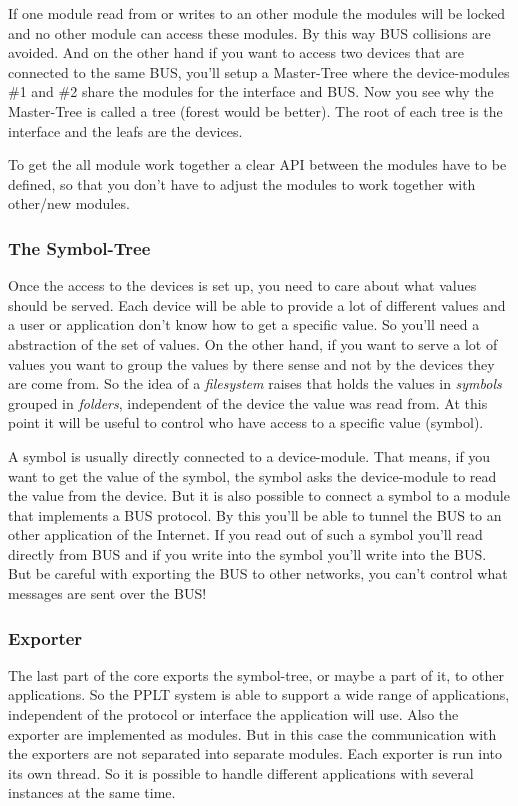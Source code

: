 If one module read from or writes to an other module the modules
will be locked and no other module can access these modules. By this way 
BUS collisions are avoided. And on the other hand if you want to access
two devices that are connected to the same BUS, you'll setup a 
Master-Tree where the device-modules \#1 and \#2 share the modules for the 
interface and BUS. Now you see why the Master-Tree is called a tree (forest 
would be better). The root of each tree is the interface and the leafs are 
the devices.

To get the all module work together a clear API between the modules have
to be defined, so that you don't have to adjust the modules to work together
with other/new modules. 

\subsubsection{The Symbol-Tree}
Once the access to the devices is set up, you need to care about what values 
should be served. Each device will be able to provide a lot of different values
and a user or application don't know how to get a specific value. So you'll 
need a abstraction of the set of values. On the other hand, if you want to 
serve a lot of values you want to group the values by there sense and not by the
devices they are come from. So the idea of a \textit{filesystem} raises that holds 
the values in \textit{symbols} grouped in \textit{folders}, independent of the 
device the value was read from. At this point it will be useful to control
who have access to a specific value (symbol). 

A symbol is usually directly connected to a device-module. That means, if you 
want to get the value of the symbol, the symbol asks the device-module to read
the value from the device. But it is also possible to connect a symbol to a
module that implements a BUS protocol. By this you'll be able to tunnel the 
BUS to an other application of the Internet. If you read out of such a symbol
you'll read directly from BUS and if you write into the symbol you'll write 
into the BUS. But be careful with exporting the BUS to other networks, you
can't control what messages are sent over the BUS!


\subsubsection{Exporter}
The last part of the core exports the symbol-tree, or maybe a part of it, to
other applications. So the PPLT system is able to support a wide range of 
applications, independent of the protocol or interface the application
will use. Also the exporter are implemented as modules. But in this case
the communication with the exporters are not separated into separate modules.
Each exporter is run into its own thread. So it is possible to handle
different applications with several instances at the same time. 



